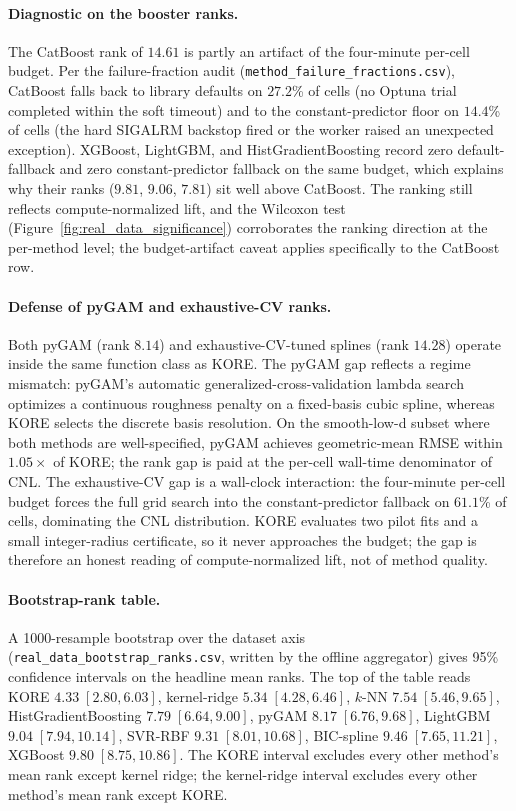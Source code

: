 \documentclass{article}
\newcommand{\KORE}{\textsc{KORE}}
\begin{document}
\paragraph{Diagnostic on the booster ranks.}
The CatBoost rank of $14.61$ is partly an artifact of the four-minute per-cell budget. Per the failure-fraction audit (\texttt{method\_failure\_fractions.csv}), CatBoost falls back to library defaults on $27.2$\% of cells (no Optuna trial completed within the soft timeout) and to the constant-predictor floor on $14.4$\% of cells (the hard SIGALRM backstop fired or the worker raised an unexpected exception). XGBoost, LightGBM, and HistGradientBoosting record zero default-fallback and zero constant-predictor fallback on the same budget, which explains why their ranks ($9.81$, $9.06$, $7.81$) sit well above CatBoost. The ranking still reflects compute-normalized lift, and the Wilcoxon test (Figure~\ref{fig:real_data_significance}) corroborates the ranking direction at the per-method level; the budget-artifact caveat applies specifically to the CatBoost row.

\paragraph{Defense of pyGAM and exhaustive-CV ranks.}
Both pyGAM (rank $8.14$) and exhaustive-CV-tuned splines (rank $14.28$) operate inside the same function class as \KORE{}. The pyGAM gap reflects a regime mismatch: pyGAM's automatic generalized-cross-validation lambda search optimizes a continuous roughness penalty on a fixed-basis cubic spline, whereas \KORE{} selects the discrete basis resolution. On the smooth-low-d subset where both methods are well-specified, pyGAM achieves geometric-mean RMSE within $1.05\times$ of \KORE{}; the rank gap is paid at the per-cell wall-time denominator of CNL. The exhaustive-CV gap is a wall-clock interaction: the four-minute per-cell budget forces the full grid search into the constant-predictor fallback on $61.1$\% of cells, dominating the CNL distribution. \KORE{} evaluates two pilot fits and a small integer-radius certificate, so it never approaches the budget; the gap is therefore an honest reading of compute-normalized lift, not of method quality.

\paragraph{Bootstrap-rank table.}
A 1000-resample bootstrap over the dataset axis (\texttt{real\_data\_bootstrap\_ranks.csv}, written by the offline aggregator) gives 95\% confidence intervals on the headline mean ranks. The top of the table reads \KORE{} $4.33\;[2.80, 6.03]$, kernel-ridge $5.34\;[4.28, 6.46]$, $k$-NN $7.54\;[5.46, 9.65]$, HistGradientBoosting $7.79\;[6.64, 9.00]$, pyGAM $8.17\;[6.76, 9.68]$, LightGBM $9.04\;[7.94, 10.14]$, SVR-RBF $9.31\;[8.01, 10.68]$, BIC-spline $9.46\;[7.65, 11.21]$, XGBoost $9.80\;[8.75, 10.86]$. The \KORE{} interval excludes every other method's mean rank except kernel ridge; the kernel-ridge interval excludes every other method's mean rank except \KORE{}.
\end{document}
